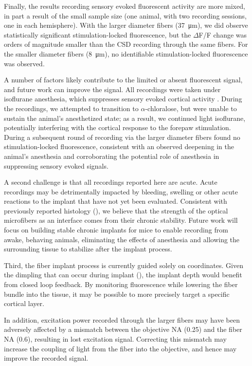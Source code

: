 Finally, the results recording sensory evoked fluorescent activity are
 more mixed, in part a result of the small sample size (one animal, 
with two recording sessions, one in each hemisphere). With the larger 
diameter fibers (37~\si{\micro\meter}), we did observe statistically 
significant stimulation-locked fluorescence, but the $\Delta$F/F 
change was orders of magnitude smaller than the CSD recording through 
the same fibers. For the smaller diameter fibers 
(8~\si{\micro\meter}), no identifiable stimulation-locked fluorescence
 was observed.

A number of factors likely contribute to the limited or absent 
fluorescent signal, and future work can improve the signal. All 
recordings were taken under isoflurane anesthesia, which suppresses 
sensory evoked cortical activity \cite{Sitdikova:2013fn}. During the 
recordings, we attempted to transition to $\alpha$-chloralose, but were 
unable to sustain the animal's anesthetized state; as a result, we 
continued light isoflurane, potentially interfering with the cortical 
response to the forepaw stimulation. During a subsequent round of 
recording via the larger diameter fibers found no stimulation-locked 
fluorescence, consistent with an observed deepening in the animal's 
anesthesia and corroborating the potential role of anesthesia in 
suppressing sensory evoked signals.

A second challenge is that all recordings reported here are acute. 
Acute recordings may be detrimentally impacted by bleeding, swelling 
or other acute reactions to the implant that have not yet been 
evaluated. Consistent with previously reported histology 
(), we believe that the strength of the optical 
microfibers as an interface comes from their chronic stability. Future
 work will focus on building stable chronic implants for mice to 
enable recording from awake, behaving animals, eliminating the effects
 of anesthesia and allowing the surrounding tissue to stabilize after 
the implant process.

Third, the fiber implant process is currently guided solely on 
coordinates. Given the dimpling that can occur during implant 
(), the implant depth would benefit from closed 
loop feedback. By monitoring fluorescence while lowering the fiber 
bundle into the tissue, it may be possible to more precisely target a 
specific cortical layer.

In addition, excitation power recorded through the larger fibers may 
have been adversely affected by a mismatch between the objective NA 
(0.25) and the fiber NA (0.6), resulting in lost excitation signal. 
Correcting this mismatch may increase the coupling of light from the 
fiber into the objective, and hence may improve the recorded signal.

